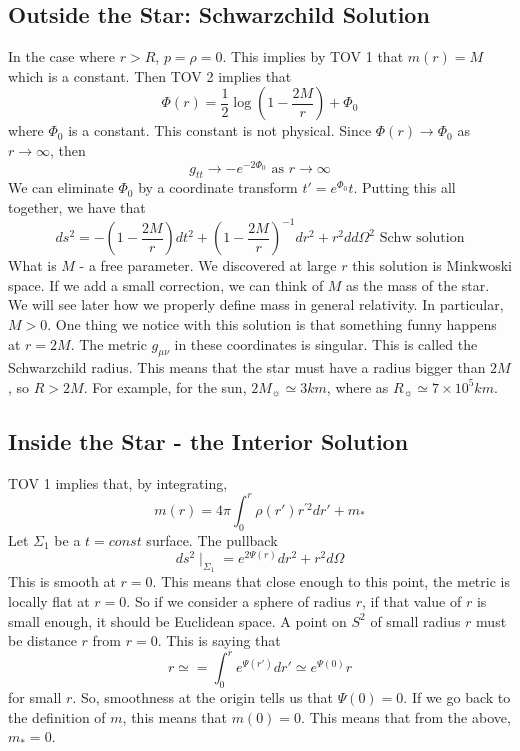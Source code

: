 \documentclass[11pt, oneside]{article}   	%
\theoremstyle{slanted}
\begin{document}
\subsection{Outside the Star: Schwarzchild Solution}
In the case where  $ r > R $, $ p = \rho = 0$. 
This implies  by TOV 1 that $ m ( r ) = M $ which is 
a constant. 
Then TOV 2 implies that 
\[
\Phi ( r ) = \frac{1}{2 } \log \left( 1 - \frac{2M}{r }  \right) + \Phi _ 0 
\] where $ \Phi _ 0 $ is a constant. This constant is not 
physical. Since $ \Phi ( r ) \to \Phi _ 0 $ as  $ r \to \infty $, 
then 
\[
g _{ t t } \to  - e^{  - 2 \Phi_0 } \text{ as } r \to \infty 
\] We can eliminate $ \Phi _ 0 $ by a coordinate transform 
$ t' = e^{ \Phi _ 0 } t$. 
Putting this all together, we have that 
\[
ds ^ 2 =   - \left( 1 - \frac{2M}{r }  \right)  dt ^ 2 + \left( 
1 - \frac{2M}{r } \right)  ^{ - 1 } dr ^ 2 + r ^ 2 d d\Omega ^ 2 \text{ Schw solution}
\] What is $ M $ - a free parameter. 
We discovered at large $ r $ this solution is Minkwoski space. If we 
add a small correction, we can think of $ M $ as the mass of the star. 
We will see later how we properly define mass in general relativity. 
In particular, $ M > 0 $. 
One thing we notice with this solution is that something 
funny happens at $ r = 2M $. The metric $ g _{ \mu \nu } $ in 
these coordinates is singular. This is 
called the Schwarzchild radius. 
This means that the star must have a radius bigger than $ 2M $, so $ R > 2M $. 
For example, for the sun, $ 2M _{ \sun } \simeq 3km $, where as 
$ R _{\sun} \simeq 7 \times 10 ^{ 5 } km $. 

\subsection{Inside the Star - the Interior Solution}
TOV 1 implies that, by integrating, 
\[
m ( r ) = 4 \pi \int_ 0 ^{ r }\rho ( r ' ) r ^{ '  2} dr ' + m _{ * }
\] Let $ \Sigma _ 1 $ be a $ t  = const $ surface. 
The pullback 
\[
ds ^ 2 \mid_{ \Sigma _ 1 }  = e ^{ 2 \Psi ( r ) } dr ^ 2 + r ^ 2 d \Omega
\] This is smooth at $ r = 0$. This means that 
close enough to this point, the metric is locally flat 
at $ r  =0 $. So if we consider a sphere of radius  $ r $, 
if that value of $ r $ is small enough, it should 
be Euclidean space. A point on $ S ^ 2 $ of small radius $r $ 
must be distance $ r $ from $ r = 0 $. 
This is saying that 
\[
r \simeq  = \int_ 0 ^{ r } e ^{ \Psi ( r ' ) } dr ' \simeq e ^{ \Psi ( 0 ) } r  
\] for small $r  $. So, smoothness at the origin tells us that 
$ \Psi ( 0 )  = 0 $. 
If we go back to the definition of 
$ m $, this means that $ m ( 0 ) = 0 $. 
This means that from the above, $ m _ *  =0 $. 
\end{document}
